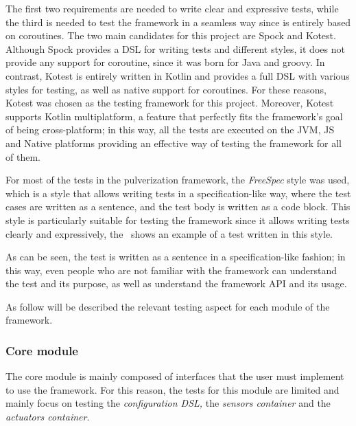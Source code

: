 The first two requirements are needed to write clear and expressive tests, while the third is needed to test the framework in a seamless way since
is entirely based on coroutines.
The two main candidates for this project are Spock and Kotest. Although Spock provides a DSL for writing tests and different styles, it does not
provide any support for coroutine, since it was born for Java and groovy. In contrast, Kotest is entirely written in Kotlin and provides a full DSL
with various styles for testing, as well as native support for coroutines.
For these reasons, Kotest was chosen as the testing framework for this project. Moreover, Kotest supports Kotlin multiplatform, a feature that
perfectly fits the framework's goal of being cross-platform; in this way, all the tests are executed on the JVM, JS and Native platforms providing
an effective way of testing the framework for all of them.

For most of the tests in the pulverization framework, the \emph{FreeSpec} style was used, which is a style that allows writing tests in a
specification-like way, where the test cases are written as a sentence, and the test body is written as a code block.
This style is particularly suitable for testing the framework since it allows writing tests clearly and expressively, the~ shows
an example of a test written in this style.

As can be seen, the test is written as a sentence in a specification-like fashion; in this way, even people who are not familiar with the framework
can understand the test and its purpose, as well as understand the framework API and its usage.



As follow will be described the relevant testing aspect for each module of the framework.

\subsubsection{Core module}

The core module is mainly composed of interfaces that the user must implement to use the framework. For this reason, the tests for this module
are limited and mainly focus on testing the \emph{configuration DSL,} the \emph{sensors container} and the \emph{actuators container}.

